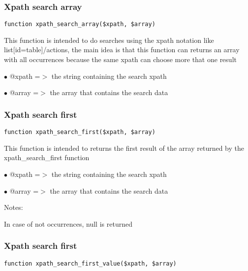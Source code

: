 \documentclass[a4paper]{article}
\begin{document}
\hypertarget{toc64}{}
\subsubsection{Xpath search array}

\begin{lstlisting}
function xpath_search_array($xpath, $array)
\end{lstlisting}

This function is intended to do searches using the xpath notation
like list[id=table]/actions, the main idea is that this function can
returns an array with all occurrences because the same xpath can choose
more that one result

\begin{compactitem}
\item[\color{myblue}$\bullet$] @xpath =$>$ the string containing the search xpath
\item[\color{myblue}$\bullet$] @array =$>$ the array that contains the search data
\end{compactitem}

\hypertarget{toc65}{}
\subsubsection{Xpath search first}

\begin{lstlisting}
function xpath_search_first($xpath, $array)
\end{lstlisting}

This function is intended to returns the first result
of the array returned by the xpath\_search\_first function

\begin{compactitem}
\item[\color{myblue}$\bullet$] @xpath =$>$ the string containing the search xpath
\item[\color{myblue}$\bullet$] @array =$>$ the array that contains the search data
\end{compactitem}

Notes:

In case of not occurrences, null is returned

\hypertarget{toc66}{}
\subsubsection{Xpath search first}

\begin{lstlisting}
function xpath_search_first_value($xpath, $array)
\end{lstlisting}
\end{document}
